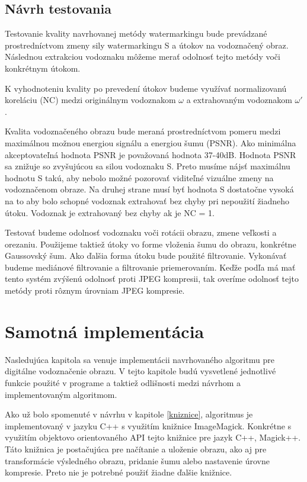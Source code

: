 \section{Návrh testovania}
Testovanie kvality navrhovanej metódy watermarkingu bude prevádzané prostredníctvom zmeny sily watermarkingu S a útokov na vodoznačený obraz. Následnou extrakciou vodoznaku môžeme merať odolnosť tejto metódy voči konkrétnym útokom.

K vyhodnoteniu kvality po prevedení útokov budeme využívať normalizovanú koreláciu (NC) medzi originálnym vodoznakom $\omega$ a extrahovaným vodoznakom $\omega'$.

Kvalita vodoznačeného obrazu bude meraná prostredníctvom pomeru medzi maximálnou možnou energiou signálu a energiou šumu (PSNR). Ako minimálna akceptovateľná hodnota PSNR je považovaná hodnota 37-40dB. Hodnota PSNR sa znižuje so zvyšujúcou sa silou vodoznaku S. Preto musíme nájsť maximálnu hodnotu S takú, aby nebolo možné pozorovať viditeľné vizuálne zmeny na vodoznačenom obraze. Na druhej strane musí byť hodnota S dostatočne vysoká na to aby bolo schopné vodoznak extrahovať bez chyby pri nepoužití žiadneho útoku. Vodoznak je extrahovaný bez chyby ak je NC = 1.

Testovať budeme odolnosť vodoznaku voči rotácii obrazu, zmene veľkosti a orezaniu. Použijeme taktiež útoky vo forme vloženia šumu do obrazu, konkrétne Gaussovský šum. Ako ďalšia forma útoku bude použité filtrovanie. Vykonávať budeme mediánové filtrovanie a filtrovanie priemerovaním. Keďže podľa \cite{QRdecomposition} má mať tento systém zvýšenú odolnosť proti JPEG kompresii, tak overíme odolnosť tejto metódy proti rôznym úrovniam JPEG kompresie.

\chapter{Samotná implementácia}
Nasledujúca kapitola sa venuje implementácii navrhovaného algoritmu pre digitálne vodoznačenie obrazu. V tejto kapitole budú vysvetlené jednotlivé funkcie použité v programe a taktiež odlišnosti medzi návrhom a implementovaným algoritmom.

Ako už bolo spomenuté v návrhu v kapitole \ref{kniznice}, algoritmus je implementovaný v jazyku C++ s využitím knižnice ImageMagick. Konkrétne s využitím objektovo orientovaného API tejto knižnice pre jazyk C++, Magick++. Táto knižnica je postačujúca pre načítanie a uloženie obrazu, ako aj pre transformácie výsledného obrazu, pridanie šumu alebo nastavenie úrovne kompresie. Preto nie je potrebné použiť žiadne ďalšie knižnice.

